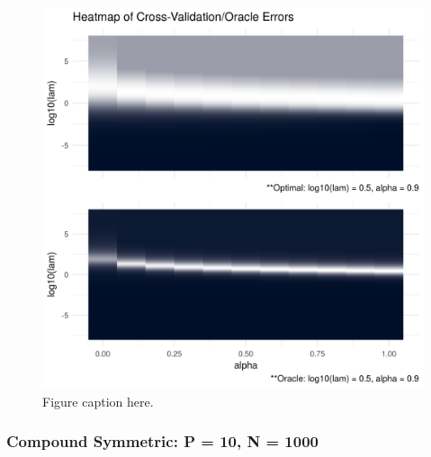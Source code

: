 \documentclass[11pt,]{report}
\begin{document}
\vspace{0.5cm}

\begin{figure}

{\centering \includegraphics[width=0.9\linewidth,]{images/compound_N50_P100} 

}

\caption{Figure caption here.}\label{fig:admmsim1}
\end{figure}

\hypertarget{compound-symmetric-p-10-n-1000}{%
\subsubsection{Compound Symmetric: P = 10, N = 1000}\label{compound-symmetric-p-10-n-1000}}
\end{document}
